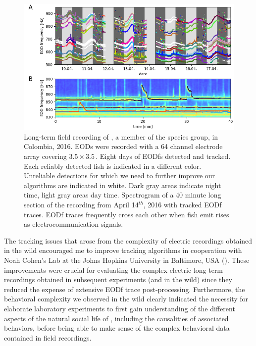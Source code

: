 \begin{figure}[h!]
  \centerline{\includegraphics[width=1\textwidth]{traces}}
  \caption{\label{Colombia_traces} Long-term field recording of \macros{}, a member of the \lepto{} species group, in Colombia, 2016. EODs were recorded with a 64 channel electrode array covering $3.5 \times 3.5$\,\meter\squared.  Eight days of EODfs detected and tracked. Each reliably detected fish is indicated in a different color. Unreliable detections for which we need to further improve our algorithms are indicated in white. Dark gray areas indicate night time, light gray areas day time.  Spectrogram of a 40 minute long section of the recording from April 14$^{th}$, 2016 with tracked EODf traces. EODf traces frequently cross each other when fish emit rises as electrocommunication signals.}
\end{figure}

The tracking issues that arose from the complexity of electric recordings obtained in the wild encouraged me to improve tracking algorithms in cooperation with Noah Cohen's Lab at the Johns Hopkins University in Baltimore, USA (). These improvements were crucial for evaluating the complex electric long-term recordings obtained in subsequent experiments (and in the wild) since they reduced the expense of extensive EODf trace post-processing. Furthermore, the behavioral complexity we observed in the wild clearly indicated the necessity for elaborate laboratory experiments to first gain understanding of the different aspects of the natural social life of \lepto{}, including the causalities of associated behaviors, before being able to make sense of the complex behavioral data contained in field recordings. 


%

